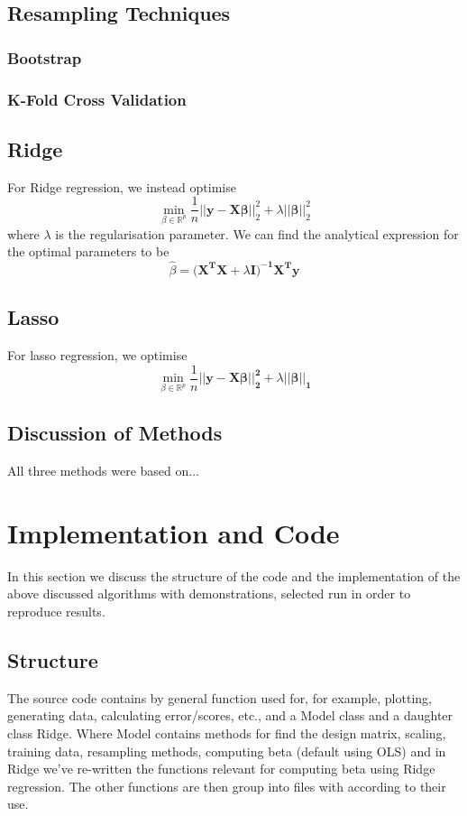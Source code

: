 \documentclass[sigconf, nonacm]{acmart}
\begin{document}
\subsection{Resampling Techniques}
\subsubsection{Bootstrap}%
\label{ssub:Bootstrap}

\subsubsection{K-Fold Cross Validation}%
\label{ssub:K-Fold Cross Validation}

\subsection{Ridge}
For Ridge regression, we instead optimise
\[ \min_{\beta \in \mathbb{R}^{p}} \frac{1}{n} \left | \left|\boldsymbol{y-X\beta} \right | \right |_2^{2} + \lambda \left ||\boldsymbol{\beta}\right||_2^2  \] 
where $ \lambda $ is the regularisation parameter.
We can find the analytical expression for the optimal parameters to be
\[ \hat \beta = \boldsymbol{(X^{T}X} + \lambda \boldsymbol{I)^{-1} X^{T} y}  \] 

\subsection{Lasso}
For lasso regression, we optimise
\[ \min_{\beta \in \mathbb{R}^{p}} \frac{1}{n} \boldsymbol{||y-X\beta||_2^2 + } \lambda||\boldsymbol{\beta||_1} \] 

\subsection{Discussion of Methods}
All three methods were based on... 
\section{Implementation and Code}
In this section we discuss the structure of the code and the implementation of the above discussed algorithms with demonstrations, selected run in order to reproduce results.
\subsection{Structure}
The source code contains by general function used for, for example, plotting, generating data, calculating error/scores, etc., and a Model class and a daughter class Ridge. Where Model contains methods for find the design matrix, scaling, training data, resampling methods, computing beta (default using OLS) and in Ridge we've re-written the functions relevant for computing beta using Ridge regression. The other functions are then group into files with according to their use. 
\end{document}
